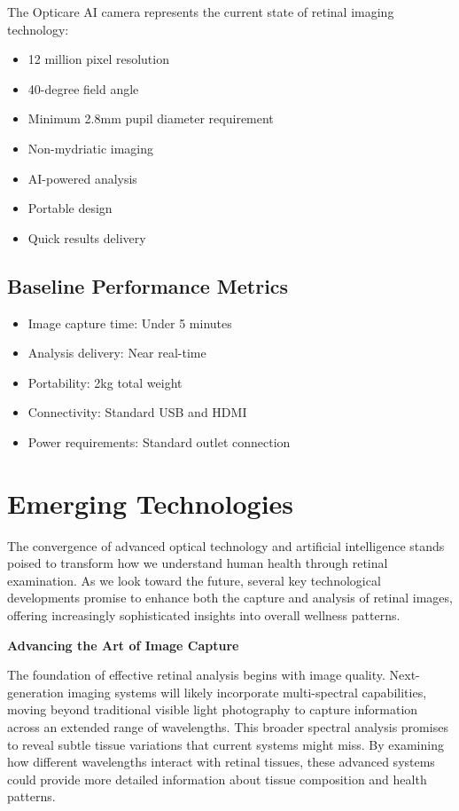 \documentclass[
  Letterpaper,
]{scrbook}
\providecommand{\tightlist}{%
  \setlength{\itemsep}{0pt}\setlength{\parskip}{0pt}}\usepackage{longtable,booktabs,array}
\begin{document}
The Opticare AI camera represents the current state of retinal imaging
technology:

\begin{itemize}
\tightlist
\item
  12 million pixel resolution
\item
  40-degree field angle
\item
  Minimum 2.8mm pupil diameter requirement
\item
  Non-mydriatic imaging
\item
  AI-powered analysis
\item
  Portable design
\item
  Quick results delivery
\end{itemize}

\subsection*{Baseline Performance
Metrics}\label{baseline-performance-metrics}

\begin{itemize}
\tightlist
\item
  Image capture time: Under 5 minutes
\item
  Analysis delivery: Near real-time
\item
  Portability: 2kg total weight
\item
  Connectivity: Standard USB and HDMI
\item
  Power requirements: Standard outlet connection
\end{itemize}

\section{Emerging Technologies}\label{emerging-technologies}

The convergence of advanced optical technology and artificial
intelligence stands poised to transform how we understand human health
through retinal examination. As we look toward the future, several key
technological developments promise to enhance both the capture and
analysis of retinal images, offering increasingly sophisticated insights
into overall wellness patterns.

\textbf{Advancing the Art of Image Capture}

The foundation of effective retinal analysis begins with image quality.
Next-generation imaging systems will likely incorporate multi-spectral
capabilities, moving beyond traditional visible light photography to
capture information across an extended range of wavelengths. This
broader spectral analysis promises to reveal subtle tissue variations
that current systems might miss. By examining how different wavelengths
interact with retinal tissues, these advanced systems could provide more
detailed information about tissue composition and health patterns.
\end{document}
